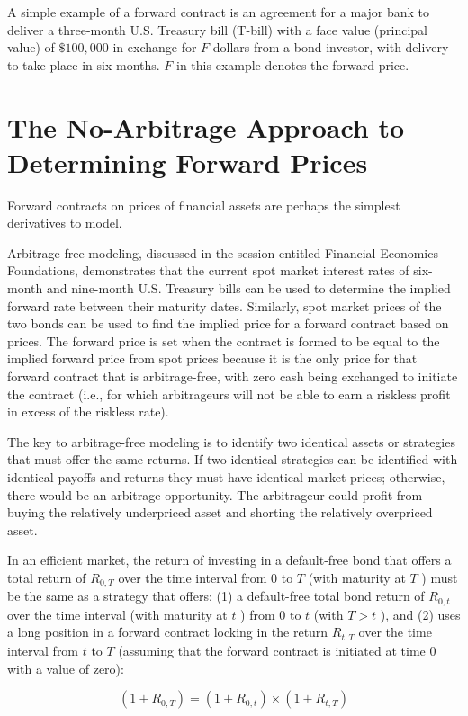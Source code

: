 \documentclass[11pt]{article}
\begin{document}
A simple example of a forward contract is an agreement for a major bank to deliver a three-month U.S. Treasury bill (T-bill) with a face value (principal value) of $\$ 100,000$ in exchange for $F$ dollars from a bond investor, with delivery to take place in six months. $F$ in this example denotes the forward price.

\section*{The No-Arbitrage Approach to Determining Forward Prices}
Forward contracts on prices of financial assets are perhaps the simplest derivatives to model.

Arbitrage-free modeling, discussed in the session entitled Financial Economics Foundations, demonstrates that the current spot market interest rates of six-month and nine-month U.S. Treasury bills can be used to determine the implied forward rate between their maturity dates. Similarly, spot market prices of the two bonds can be used to find the implied price for a forward contract based on prices. The forward price is set when the contract is formed to be equal to the implied forward price from spot prices because it is the only price for that forward contract that is arbitrage-free, with zero cash being exchanged to initiate the contract (i.e., for which arbitrageurs will not be able to earn a riskless profit in excess of the riskless rate).

The key to arbitrage-free modeling is to identify two identical assets or strategies that must offer the same returns. If two identical strategies can be identified with identical payoffs and returns they must have identical market prices; otherwise, there would be an arbitrage opportunity. The arbitrageur could profit from buying the relatively underpriced asset and shorting the relatively overpriced asset.

In an efficient market, the return of investing in a default-free bond that offers a total return of $R_{0, T}$ over the time interval from 0 to $T$ (with maturity at $T$ ) must be the same as a strategy that offers: (1) a default-free total bond return of $R_{0, t}$ over the time interval (with maturity at $t$ ) from 0 to $t$ (with $T>t$ ), and (2) uses a long position in a forward contract locking in the return $R_{t, T}$ over the time interval from $t$ to $T$ (assuming that the forward contract is initiated at time 0 with a value of zero):


\begin{equation*}
\left(1+R_{0, T}\right)=\left(1+R_{0, t}\right) \times\left(1+R_{t, T}\right) \tag{1}
\end{equation*}
\end{document}
